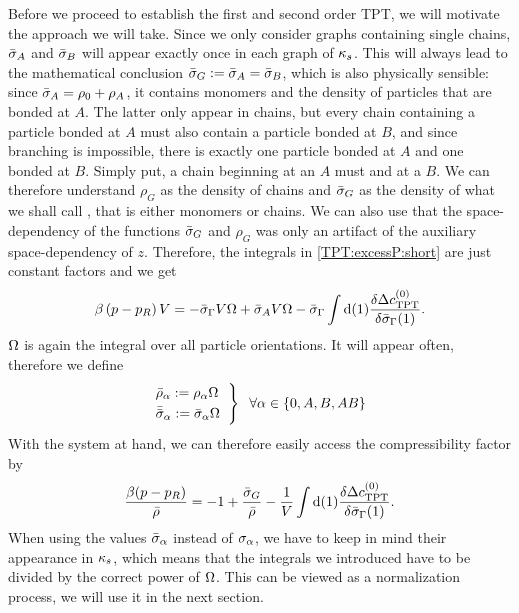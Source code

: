 \documentclass[8.5pt,twoside,twocolumn]{article}
\newcommand\di{\te{d}}
\newcommand\inon{\enmat{\int\di(1)}}
\newcommand\roz{\enmat{\rho_0}}
\theoremstyle{standard}
\begin{document}
Before we proceed to establish the first and second order TPT, we will
motivate the approach we will take. Since we only consider graphs containing
single chains, $\sia$ and $\sib$ will appear exactly once in each graph of $\kappa_s$.
This will always lead to the mathematical conclusion $\sig:=\sia=\sib$, which is
also physically sensible: since $\si_A=\roz+\rho_A$, it contains monomers and the density
of particles that are bonded at $A$. The latter only appear in chains, but every chain
containing a particle bonded at $A$ must also contain a particle bonded at $B$, and since
branching is impossible, there is exactly one particle bonded at $A$ and one bonded at $B$.
Simply put, a chain beginning at an $A$ must and at a $B$. We can therefore
understand $\rho_G$ as the density of chains and $\sig$ as the density of 
what we shall call , that is either monomers or chains. We can also use that
the space-dependency of the functions $\sig$ and $\rho_G$ was only an artifact
of the auxiliary space-dependency of $z$. Therefore, the integrals in \eqref{TPT:excessP:short}
are just constant factors and we get
\begin{equation}
\begin{aligned}
\be \rb{p-p_R}V = -\siga V \Om+\si_A V \Om- \siga \inon\delti{\dct}{\siga(1)}.
\end{aligned}
\label{TPT:excessP:noint}
\end{equation}
$\Omega$ is again the integral over all particle orientations. It will appear often, therefore
we define
\begin{equation}
\begin{rcases}
\bar \rho_\al := \rho_\al \Om\hskip .2cm \\
\bar \si_\al := \si_\al \Om\hskip .2cm 
\end{rcases}
\hskip .2cm \forall \al \in \st{0,A,B,AB}
\end{equation}
With the system at hand, we can therefore easily access the compressibility factor
by
\renewcommand\si{\bar\sigma}
\newcommand\siab{\si_{AB}}
 \newcommand\roa{\bar\rho_{A}}
 \renewcommand\roz{\bar\rho_{0}}
 \newcommand\rog{\bar\rho_{G}}
 \newcommand\rob{\bar\rho_{B}}
 \newcommand\roab{\bar\rho_{AB}}
\begin{equation}
\frac{\be(p-p_R)}{\tr}=-1+\frac{\sig}{\tr}-\frac 1 {V} \inon\delti{\dct}{\siga(1)}.
\label{TPT:excessP:nearlyNu}
\end{equation}
When using the values $\si_\al$ instead of $\sigma_{\alpha}$, we have to keep in mind their appearance in
$\kappa_s$, which means that the integrals we introduced have to be divided by the correct power
of $\Omega$. This can be viewed as a normalization process, we will use it in the next section.
\end{document}
